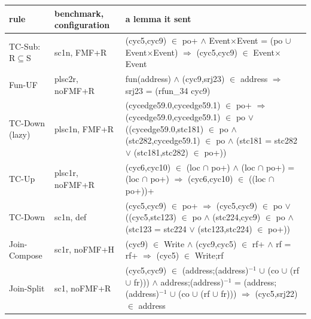 \begin{tabular}{@{}p{2.2cm}p{2.0cm}p{9.6cm}@{}}
\toprule
rule & benchmark, configuration & a lemma it sent \\
\midrule
TC-Sub: R$\subseteq$S & sc1n, FMF+R & {\ttfamily\raggedright (cyc5,cyc9) $\in$ po+ $\wedge$ Event$\times$Event = (po $\cup$ Event$\times$Event) $\Rightarrow$ (cyc5,cyc9) $\in$ Event$\times$Event} \\
Fun-UF & plsc2r, noFMF+R & {\ttfamily\raggedright fun(address) $\wedge$ (cyc9,srj23) $\in$ address $\Rightarrow$ srj23 = (rfun\_34 cyc9)} \\
TC-Down (lazy) & plsc1n, FMF+R & {\ttfamily\raggedright (cycedge59.0,cycedge59.1) $\in$ po+ $\Rightarrow$ (cycedge59.0,cycedge59.1) $\in$ po $\vee$ ((cycedge59.0,stc181) $\in$ po $\wedge$ (stc282,cycedge59.1) $\in$ po $\wedge$ (stc181 = stc282 $\vee$ (stc181,stc282) $\in$ po+))} \\
TC-Up & plsc1r, noFMF+R & {\ttfamily\raggedright (cyc6,cyc10) $\in$ (loc $\cap$ po+) $\wedge$ (loc $\cap$ po+) = (loc $\cap$ po+) $\Rightarrow$ (cyc6,cyc10) $\in$ ((loc $\cap$ po+))+} \\
TC-Down & sc1n, def & {\ttfamily\raggedright (cyc5,cyc9) $\in$ po+ $\Rightarrow$ (cyc5,cyc9) $\in$ po $\vee$ ((cyc5,stc123) $\in$ po $\wedge$ (stc224,cyc9) $\in$ po $\wedge$ (stc123 = stc224 $\vee$ (stc123,stc224) $\in$ po+))} \\
Join-Compose & sc1r, noFMF+H & {\ttfamily\raggedright (cyc9) $\in$ Write $\wedge$ (cyc9,cyc5) $\in$ rf+ $\wedge$ rf = rf+ $\Rightarrow$ (cyc5) $\in$ Write;rf} \\
Join-Split & sc1, noFMF+R & {\ttfamily\raggedright (cyc5,cyc9) $\in$ (address;(address)$^{-1}$ $\cup$ (co $\cup$ (rf $\cup$ fr))) $\wedge$ address;(address)$^{-1}$ = (address;(address)$^{-1}$ $\cup$ (co $\cup$ (rf $\cup$ fr))) $\Rightarrow$ (cyc5,srj22) $\in$ address} \\
\bottomrule
\end{tabular}
